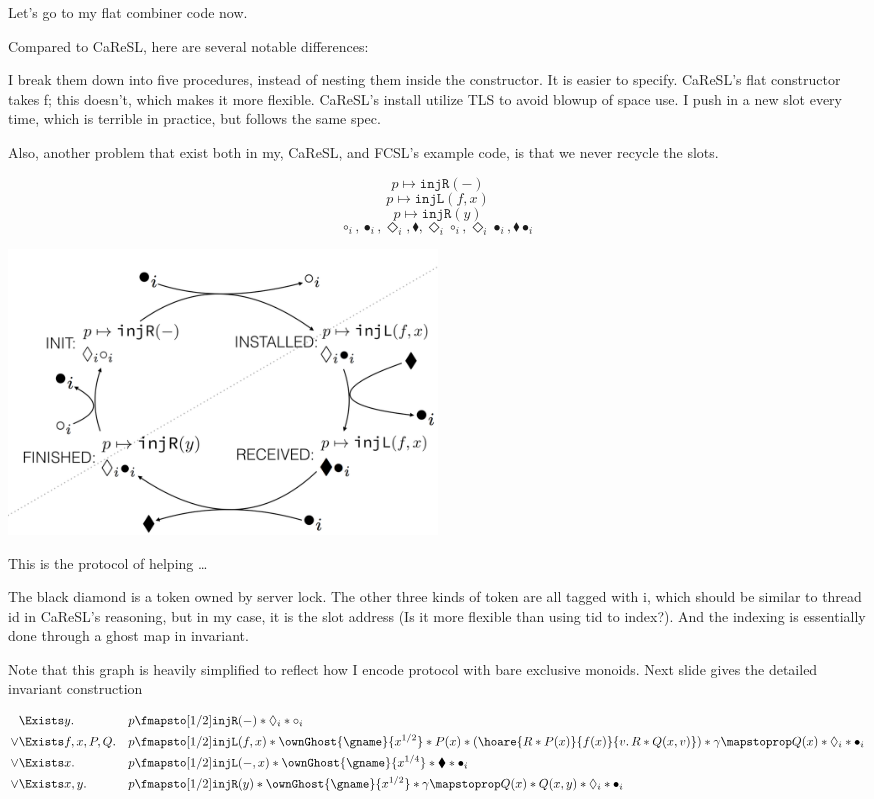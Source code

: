 \documentclass[11pt]{article}
\newcommand{\bdia}{\blacklozenge}
\newcommand{\dia}{\Diamond}
\newcommand{\injR}{\texttt{injR}}
\newcommand{\injL}{\texttt{injL}}
\begin{document}
Let’s go to my flat combiner code now.

Compared to CaReSL, here are several notable differences:

I break them down into five procedures, instead of nesting them inside the constructor. It is easier to specify.
CaReSL’s flat constructor takes f; this doesn’t, which makes it more flexible.
CaReSL’s install utilize TLS to avoid blowup of space use. I push in a new slot every time, which is terrible in practice, but follows the same spec.

Also, another problem that exist both in my, CaReSL, and FCSL’s example code, is that we never recycle the slots.

\[p \mapsto \injR(-)\]
\[p \mapsto \texttt{injL}(f, x)\]
\[p \mapsto \injR(y)\]
\[\circ_i, \bullet_i, \dia_i, \bdia, \dia_i \circ_i, \dia_i \bullet_i, \bdia \bullet_i\]


\includegraphics[width=0.5\textwidth]{helping}

This is the protocol of helping … 

The black diamond is a token owned by server lock.
The other three kinds of token are all tagged with i, which should be similar to thread id in CaReSL’s reasoning, but in my case, it is the slot address (Is it more flexible than using tid to index?). And the indexing is essentially done through a ghost map in invariant. 

Note that this graph is heavily simplified to reflect how I encode protocol with bare exclusive monoids. Next slide gives the detailed invariant construction


\begin{align*}
     &\Exists y.          &&p \fmapsto[1/2] \injR(-) * \dia_i * \circ_i\\
\lor &\Exists f, x, P, Q. &&p \fmapsto[1/2] \injL(f, x) * \ownGhost{\gname}{x^{1/2}} *
                           P(x) * (\hoare{R * P(x)}{f(x)}{v.\,R * Q(x, v)}) * \gamma \mapstoprop Q(x) * \dia_i * \bullet_i\\
\lor &\Exists x.          &&p \fmapsto[1/2] \injL(-, x) * \ownGhost{\gname}{x^{1/4}} * \bdia * \bullet_i\\
\lor &\Exists x, y.       &&p \fmapsto[1/2] \injR(y) * \ownGhost{\gname}{x^{1/2}} * \gamma \mapstoprop Q(x) * Q(x, y) * \dia_i * \bullet_i
\end{align*}
\end{document}
